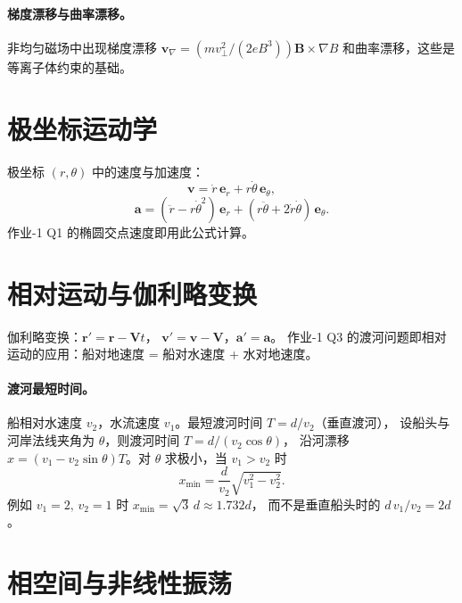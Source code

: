\documentclass[UTF8,a4paper,11pt]{ctexart}
\begin{document}
\paragraph{梯度漂移与曲率漂移。}
非均匀磁场中出现梯度漂移 $\boldsymbol v_\nabla=(m v_\perp^2/(2eB^3))\boldsymbol B\times\nabla B$
和曲率漂移，这些是等离子体约束的基础。

\section{极坐标运动学}
\label{sec:polar-kinematics}

极坐标 $(r,\theta)$ 中的速度与加速度：
\begin{equation}
  \boldsymbol v = \dot r\,\boldsymbol e_r + r\dot\theta\,\boldsymbol e_\theta,
\end{equation}
\begin{equation}
  \boldsymbol a = (\ddot r-r\dot\theta^2)\,\boldsymbol e_r
  + (r\ddot\theta+2\dot r\dot\theta)\,\boldsymbol e_\theta.
\end{equation}
作业-1 Q1 的椭圆交点速度即用此公式计算。

\section{相对运动与伽利略变换}
\label{sec:relative-motion}

伽利略变换：$\boldsymbol r'=\boldsymbol r-\boldsymbol V t$，
$\boldsymbol v'=\boldsymbol v-\boldsymbol V$，$\boldsymbol a'=\boldsymbol a$。
作业-1 Q3 的渡河问题即相对运动的应用：船对地速度 = 船对水速度 + 水对地速度。

\paragraph{渡河最短时间。}
船相对水速度 $v_2$，水流速度 $v_1$。最短渡河时间 $T=d/v_2$（垂直渡河），
设船头与河岸法线夹角为 $\theta$，则渡河时间 $T=d/(v_2\cos\theta)$，
沿河漂移 $x=(v_1-v_2\sin\theta)T$。对 $\theta$ 求极小，当 $v_1>v_2$ 时
\begin{equation}
  x_{\min}=\frac{d}{v_2}\sqrt{v_1^2-v_2^2}.
\end{equation}
例如 $v_1=2,\,v_2=1$ 时 $x_{\min}=\sqrt3\,d\approx1.732d$，
而不是垂直船头时的 $d\,v_1/v_2=2d$。

\section{相空间与非线性振荡}
\label{sec:phase-space}
\end{document}
